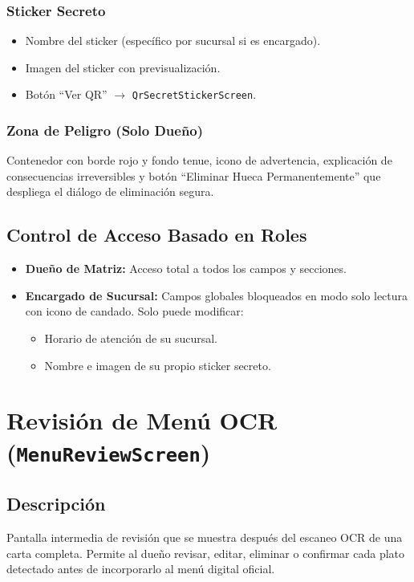 \documentclass[11pt, a4paper, oneside]{report}
\begin{document}
\subsubsection{Sticker Secreto}
\begin{itemize}
  \item Nombre del sticker (específico por sucursal si es encargado).
  \item Imagen del sticker con previsualización.
  \item Botón ``Ver QR'' $\rightarrow$ \texttt{QrSecretStickerScreen}.
\end{itemize}

\subsubsection{Zona de Peligro (Solo Dueño)}
Contenedor con borde rojo y fondo tenue, icono de advertencia, explicación de consecuencias irreversibles y botón ``Eliminar Hueca Permanentemente'' que despliega el diálogo de eliminación segura.

\subsection{Control de Acceso Basado en Roles}
\begin{itemize}
  \item \textbf{Dueño de Matriz:} Acceso total a todos los campos y secciones.
  \item \textbf{Encargado de Sucursal:} Campos globales bloqueados en modo solo lectura con icono de candado. Solo puede modificar:
  \begin{itemize}
    \item Horario de atención de su sucursal.
    \item Nombre e imagen de su propio sticker secreto.
  \end{itemize}
\end{itemize}

\section{Revisión de Menú OCR (\texttt{MenuReviewScreen})}

\subsection{Descripción}
Pantalla intermedia de revisión que se muestra después del escaneo OCR de una carta completa. Permite al dueño revisar, editar, eliminar o confirmar cada plato detectado antes de incorporarlo al menú digital oficial.
\end{document}
